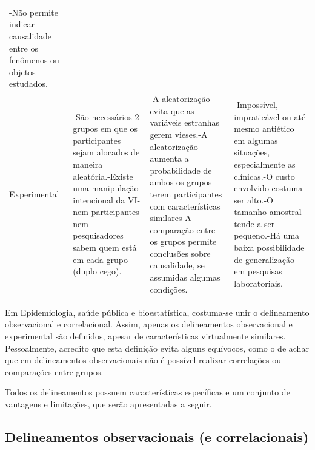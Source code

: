 \documentclass[
]{book}
\begin{document}
\begin{longtable}[]{@{}llll@{}}
\begin{minipage}[t]{0.22\columnwidth}
-Não permite indicar causalidade entre os fenômenos ou objetos estudados.\strut
\end{minipage}\tabularnewline
\begin{minipage}[t]{0.22\columnwidth}\raggedright
Experimental\strut
\end{minipage} & \begin{minipage}[t]{0.22\columnwidth}\raggedright
-São necessários 2 grupos em que os participantes sejam alocados de maneira aleatória.-Existe uma manipulação intencional da VI-nem participantes nem pesquisadores sabem quem está em cada grupo (duplo cego).\strut
\end{minipage} & \begin{minipage}[t]{0.22\columnwidth}\raggedright
-A aleatorização evita que as variáveis estranhas gerem vieses.-A aleatorização aumenta a probabilidade de ambos os grupos terem participantes com características similares-A comparação entre os grupos permite conclusões sobre causalidade, se assumidas algumas condições.\strut
\end{minipage} & \begin{minipage}[t]{0.22\columnwidth}\raggedright
-Impossível, impraticável ou até mesmo antiético em algumas situações, especialmente as clínicas.-O custo envolvido costuma ser alto.-O tamanho amostral tende a ser pequeno.-Há uma baixa possibilidade de generalização em pesquisas laboratoriais.\strut
\end{minipage}\tabularnewline
\bottomrule
\end{longtable}

Em Epidemiologia, saúde pública e bioestatística, costuma-se unir o delineamento observacional e correlacional. Assim, apenas os delineamentos observacional e experimental são definidos, apesar de características virtualmente similares. Pessoalmente, acredito que esta definição evita alguns equívocos, como o de achar que em delineamentos observacionais não é possível realizar correlações ou comparações entre grupos.

Todos os delineamentos possuem características específicas e um conjunto de vantagens e limitações, que serão apresentadas a seguir.

\hypertarget{delineamentos-observacionais-e-correlacionais}{%
\subsection{Delineamentos observacionais (e correlacionais)}\label{delineamentos-observacionais-e-correlacionais}}
\end{document}
